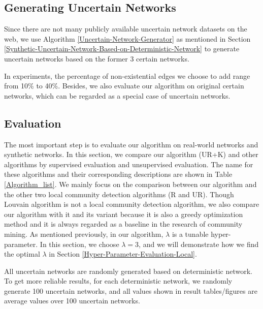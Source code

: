\documentclass[\main/thesis.tex]{subfiles}
\begin{document}
\subsection*{Generating Uncertain Networks}
Since there are not many publicly available uncertain network datasets on the web, we use Algorithm \ref{Uncertain-Network-Generator} as mentioned in Section \ref{Synthetic-Uncertain-Network-Based-on-Deterministic-Network} to generate uncertain networks based on the former 3 certain networks. 

In experiments, the percentage of non-existential edges we choose to add range from 10\% to 40\%. Besides, we also evaluate our algorithm on original certain networks, which can be regarded as a special case of uncertain networks.

\subsection{Evaluation}
The most important step is to evaluate our algorithm on real-world networks and synthetic networks. In this section, we compare our algorithm (UR+K) and other algorithms by supervised evaluation and unsupervised evaluation. The name for these algorithms and their corresponding descriptions are shown in Table \ref{Algorithm_list}. We mainly focus on the comparison between our algorithm and the other two local community detection algorithms (R and UR). Though Louvain algorithm is not a local community detection algorithm, we also compare our algorithm with it and its variant because it is also a greedy optimization method and it is always regarded as a baseline in the research of community mining. As mentioned previously, in our algorithm, $\lambda$ is a tunable hyper-parameter. In this section, we choose $\lambda=3$, and we will demonstrate how we find the optimal $\lambda$ in Section \ref{Hyper-Parameter-Evaluation-Local}.

All uncertain networks are randomly generated based on deterministic network. To get more reliable results, for each deterministic network, we randomly generate 100 uncertain networks, and all values shown in result tables/figures are average values over 100 uncertain networks.
\end{document}
